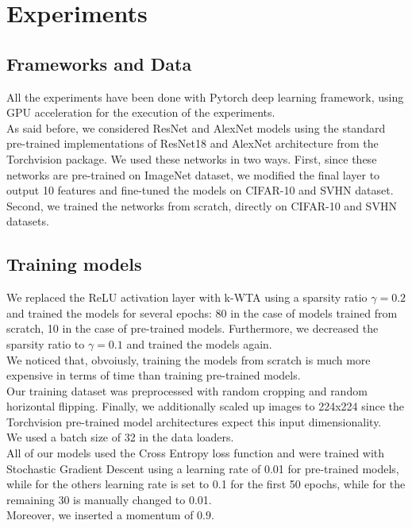 \documentclass[a4paper]{article}
\begin{document}
	\section{Experiments}
	\subsection{Frameworks and Data}
	All the experiments have been done with Pytorch deep learning framework, using GPU acceleration for the execution of the experiments.\\
	As said before, we considered ResNet and AlexNet models using the standard pre-trained implementations of ResNet18 and AlexNet architecture from the Torchvision package. We used these networks in two ways. First, since these networks are pre-trained on ImageNet dataset, we modified the final layer to output 10 features and fine-tuned the models on CIFAR-10 and SVHN dataset. Second, we trained the networks from scratch, directly on CIFAR-10 and SVHN datasets.
	
	\subsection{Training models}
	We replaced the ReLU activation layer with k-WTA using a sparsity ratio $\gamma = 0.2$ and trained the models for several epochs: 80 in the case of models trained from scratch, 10 in the case of pre-trained models. Furthermore, we decreased the sparsity ratio to $\gamma = 0.1$ and trained the models again.\\
	We noticed that, obvoiusly, training the models from scratch is much more expensive in terms of time than training pre-trained models.\\
	Our training dataset was preprocessed with random cropping and random horizontal flipping. Finally, we additionally scaled up images to 224x224 since the Torchvision pre-trained model architectures expect this input dimensionality.\\
	We used a batch size of 32 in the data loaders.\\
	All of our models used the Cross Entropy loss function and were trained with Stochastic Gradient Descent using	a learning rate of 0.01 for pre-trained models, while for the others learning rate is set to 0.1 for the first 50 epochs, while for the remaining 30 is manually changed to 0.01. \\ Moreover, we inserted a momentum of $0.9$. 
	
\end{document}
